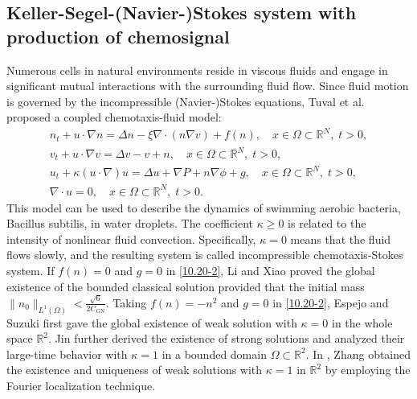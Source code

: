 \documentclass[10pt,a4paper]{amsart}
\numberwithin{equation}{section}
\begin{document}
\subsection*{Keller-Segel-(Navier-)Stokes system with production of chemosignal}
Numerous cells in natural environments reside in viscous fluids and engage in 
significant mutual interactions with the surrounding fluid flow. Since fluid motion 
is governed by the incompressible (Navier-)Stokes equations, 
Tuval et al.\ \cite{Tuval-2005} proposed a coupled chemotaxis-fluid model:
\begin{equation}\label{10.20-2}
\begin{gathered}
n_t + u \cdot \nabla n = \Delta n -\xi\nabla\cdot(n \nabla v)  + f(n), \quad
 x \in \Omega\subset \mathbb{R}^N,\; t > 0, \\
v_t + u \cdot \nabla v = \Delta v - v + n, \quad
 x \in \Omega\subset \mathbb{R}^N,\; t > 0, \\
u_t +\kappa (u\cdot \nabla) u = \Delta u + \nabla P + n \nabla \phi +g, \quad
 x \in \Omega\subset \mathbb{R}^N,\; t > 0, \\
\nabla \cdot u = 0, \quad x \in \Omega\subset \mathbb{R}^N,\; t > 0.
\end{gathered}
\end{equation}
This model can be used to describe the dynamics of swimming aerobic bacteria, 
Bacillus subtilis, in water droplets. 
The coefficient $\kappa\geq 0$ is related to the intensity of nonlinear fluid 
convection. Specifically, $\kappa = 0$ means that the fluid flows slowly, and the
resulting system is called incompressible chemotaxis-Stokes system. 
If $ f(n)=0 $ and $ g=0 $ in \eqref{10.20-2}, Li and Xiao \cite{s1468} proved the 
global existence of the bounded classical solution provided that the initial mass
$\|n_0\|_{L^{1}(\Omega)} < \frac{\sqrt{6}}{2 C_{\mathrm{GN}}}$. 
Taking $ f(n)=-n^2$ and $g=0$ in \eqref{10.20-2}, Espejo and Suzuki \cite{Espejo} 
first gave the global existence of weak solution with $\kappa=0$ in the whole space
$\mathbb{R}^2$. Jin \cite{Jin} further derived the existence of strong solutions and 
analyzed their large-time behavior with $\kappa = 1$ in a bounded domain 
$\Omega\subset \mathbb{R}^2 $. In \cite{Zhang}, Zhang obtained the existence and 
uniqueness of weak solutions with $\kappa=1$ in $\mathbb{R}^2$ by employing the 
Fourier localization technique.
\end{document}
